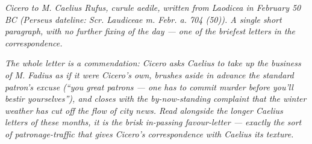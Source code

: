 
\textit{Cicero to M. Caelius Rufus, curule aedile,
written from Laodicea in February 50 BC (Perseus
dateline: \textit{Scr. Laudiceae m. Febr. a. 704 (50)}).
A single short paragraph, with no further fixing of the
day --- one of the briefest letters in the
correspondence.}

\textit{The whole letter is a commendation: Cicero asks
Caelius to take up the business of M. Fadius as if it
were Cicero's own, brushes aside in advance the standard
patron's excuse (``you great patrons --- one has to
commit murder before you'll bestir yourselves''), and
closes with the by-now-standing complaint that the
winter weather has cut off the flow of city news. Read
alongside the longer Caelius letters of these months,
it is the brisk in-passing favour-letter --- exactly the
sort of patronage-traffic that gives Cicero's
correspondence with Caelius its texture.}
